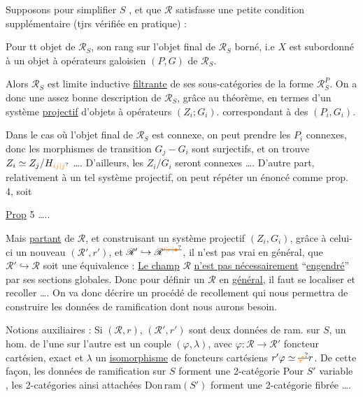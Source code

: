  Supposons pour simplifier $S$ , et que $\mathscr R$ satisfasse une petite condition supplémentaire (tjrs vérifiée en pratique) : 

Pour tt objet de $\mathscr R_S$, son rang sur l'objet final de $\mathscr R_S$  borné, i.e $X$ est subordonné à un  objet à opérateurs galoisien $(P,G)$ de $\mathscr R_S$.

Alors $\mathscr R_S$ est limite inductive \uline{filtrante} de ses sous-catégories de la forme $\mathscr R_S^P$. On a donc une assez bonne description de $\mathscr R_S$, grâce au théorème, en termes d'un système \uline{projectif} d'objets à opérateurs $(Z_i;G_i)$.
correspondant à des $(P_i,G_i)$.

Dans le cas où l'objet final de $\mathscr R_S$ est connexe, on peut prendre les $P_i$ connexes, donc les morphismes de transition $G_j-G_i$ sont surjectifs, et on trouve $Z_i\simeq Z_j/H_{\unsure{ij|j}}$ \ldots. D'ailleurs, les $Z_i/G_i$ seront connexes \ldots. D'autre part, relativement à un tel système projectif, on peut répéter un énoncé comme prop. 4, soit

\uline{Prop} 5 \ldots..

Mais  \uline{partant} de $\mathscr R$, et construisant un système projectif $(Z_i,G_i)$,  grâce à celui-ci un nouveau  $(\mathscr R',r')$, et $\mathscr R'\hookrightarrow\mathscr R^{\deleted{\unsure{\prime|r|\bullet}}}$, il n'est pas vrai en général,  que $\mathscr R'\hookrightarrow\mathscr R$ soit une équivalence : \uline{Le champ} $\mathscr R$ \uline{n'est pas nécessairement} ``\uline{engendré}'' par ses sections globales. Donc pour définir un $\mathscr R$ en \uline{général}, il faut se localiser et recoller \ldots. On va donc décrire un procédé de recollement qui nous permettra de construire les données de ramification dont nous aurons besoin.

Notions auxiliaires : Si $(\mathscr R,r)$, $(\mathscr R',r')$ sont deux données de ram. sur $S$, un hom. de l'une sur l'autre est un couple $(\varphi,\lambda)$, avec $\varphi:\mathscr R\longrightarrow\mathscr R'$  foncteur cartésien, exact  et $\lambda$ un \uline{isomorphisme} de foncteurs cartésiens $r'\varphi\simeq\deleted{\unsure{\varphi}}r$.  De cette façon,
les données de ramification sur $S$ forment une 2-catégorie  Pour $S'$ variable , les 2-catégories ainsi attachées $\mathrm{Don\,ram}(S')$ forment une 2-catégorie fibrée \ldots.

